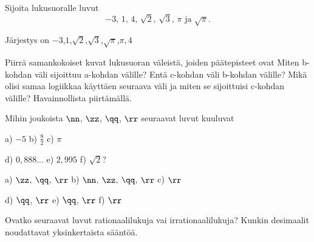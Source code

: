 \begin{tehtavasivu}

\begin{tehtava}%
Sijoita lukusuoralle luvut
\[
\mbox{$-3$, $1$, $4$, $\sqrt{2}$, $\sqrt{3}$, $\pi$ ja $\sqrt{\pi}$.}
\]
\begin{vastaus}
Järjestys on \mbox{$-3$,$1$,$\sqrt{2}$,$\sqrt{3}$,$\sqrt{\pi}$,$\pi,4$}
\end{vastaus}
\end{tehtava}

\begin{tehtava} %
Piirrä samankokoiset kuvat lukusuoran väleistä, joiden päätepisteet ovat 
Miten b-kohdan väli sijoittuu a-kohdan välille? Entä c-kohdan väli b-kohdan välille? Mikä olisi samaa logiikkaa käyttäen seuraava väli ja miten se sijoittuisi c-kohdan välille? Havainnollista piirtämällä.
\end{tehtava}


\begin{tehtava}
Mihin joukoista $\nn$, $\zz$, $\qq$, $\rr$ seuraavat luvut kuuluvat

a) $-5$ \qquad b) $\frac82$ \qquad c) $\pi$

d) $0,888...$ \qquad e) $2,995$ \qquad f) $\sqrt{2}$?

\begin{vastaus}
a) $\zz$, $\qq$, $\rr$ \qquad b) $\nn$, $\zz$, $\qq$, $\rr$ \qquad c) $\rr$

d) $\qq$, $\rr$ \qquad e) $\qq$, $\rr$ \qquad f) $\rr$
\end{vastaus}
\end{tehtava}

\begin{tehtava}
Ovatko seuraavat luvut rationaalilukuja vai irrationaalilukuja? Kunkin desimaalit
noudattavat yksinkertaista sääntöä.
\begin{vastaus}
\end{vastaus}
\end{tehtava}

\begin{tehtava}%
\begin{vastaus}
\end{vastaus}
\end{tehtava}



\end{tehtavasivu}
